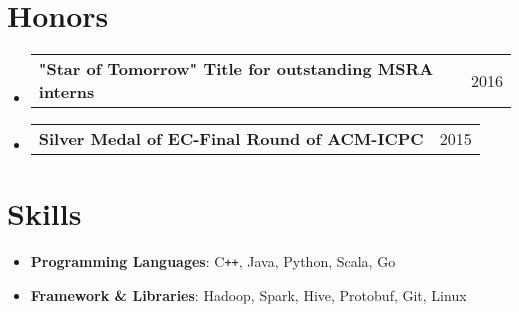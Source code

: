 \documentclass[a4paper,11pt]{article}
\makeatletter
\newcommand{\resumeMiniheading}[2]{
  \vspace{-1pt}\item
    \begin{tabular*}{0.97\textwidth}{l@{\extracolsep{\fill}}r}
      \textbf{#1} & #2
    \end{tabular*}
}
\makeatother
\begin{document}
\section{Honors}
  \begin{itemize}[leftmargin=*, itemsep=-1pt, label={}]
    \resumeMiniheading{"Star of Tomorrow" Title for outstanding MSRA interns \normalfont{(Rate: 10\%)}}{2016}
    \resumeMiniheading{Silver Medal of EC-Final Round of ACM-ICPC}{2015}
  \end{itemize}

\section{Skills}
  \begin{itemize}[leftmargin=*, itemsep=-2pt, label={}]
    \item{
      \textbf{Programming Languages}{: C\texttt{++}, Java, Python, Scala, Go}
    }
    \item{
      \textbf{Framework \& Libraries}{: Hadoop, Spark, Hive, Protobuf, Git, Linux}
    }
  \end{itemize}


\end{document}
